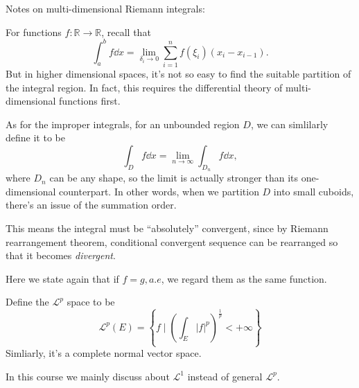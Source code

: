 \begin{remark}
    Notes on multi-dimensional Riemann integrals:

	For functions $f: \mathbb{R}\to \mathbb{R}$, recall that
	\[
	\int_{a}^{b} f\dd x = \lim_{\delta_i\to 0}\sum_{i=1}^{n} f(\xi_i)(x_i-x_{i-1}).
	\]
	But in higher dimensional spaces, it's not so easy to find the suitable
	partition of the integral region. In fact, this requires the differential
	theory of multi-dimensional functions first.

	As for the improper integrals, for an unbounded region $D$,
	we can simlilarly define it to be
	\[
	\int_D f \dd x = \lim_{n\to \infty}\int_{D_n} f\dd x,
	\]
	where $D_n$ can be any shape, so the limit is actually stronger than
	its one-dimensional counterpart. In other words, when we partition $D$
	into small cuboids, there's an issue of the summation order.

	This means the integral must be ``absolutely'' convergent, since by
	Riemann rearrangement theorem, conditional convergent sequence can
	be rearranged so that it becomes \textit {divergent}.
\end{remark}

Here we state again that if $f=g,a.e$, we regard them as the same function.

 \begin{definition}
	Define the $ \mathcal{L}^p$ space to be
	\[
	\mathcal{L}^p(E) = \left\{f \mid \left( \int_E |f|^p \right)^\frac{1}{p}
	< +\infty\right\}
	\]
	Simliarly, it's a complete normal vector space.
\end{definition}

In this course we mainly discuss about $\mathcal{L}^1$ instead of general
$\mathcal{L}^p$.

